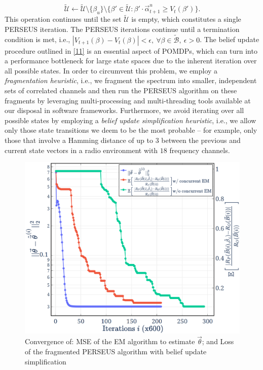 \documentclass[10pt,twocolumn]{IEEEtran}
\begin{document}
$$
\tilde{\mathcal{U}}\leftarrow \tilde{\mathcal{U}}\setminus\{\beta_u\}\setminus
\{\beta'\in\tilde{\mathcal{U}}:\beta'{\cdot}\vec{\alpha}_{t+1}^{u}\geq V_t(\beta')\}.
$$
This operation continues until the set $\tilde{\mathcal{U}}$ is empty, which constitutes a single PERSEUS iteration. The PERSEUS iterations continue until a termination condition is met, i.e., $|V_{t{+}1}(\beta){-}V_{t}(\beta)|{<}\epsilon,\ \forall \beta{\in} \tilde{\mathcal{B}},\ \epsilon{>}0$. The belief update procedure outlined in \eqref{11} is an essential aspect of POMDPs, which can turn into a performance bottleneck for large state spaces due to the inherent iteration over all possible states. In order to circumvent this problem, we employ a \emph{fragmentation heuristic}, i.e., we fragment the spectrum into smaller, independent sets of correlated channels and then run the PERSEUS algorithm on these fragments by leveraging multi-processing and multi-threading tools available at our disposal in software frameworks. Furthermore, we avoid iterating over all possible states by employing a \emph{belief update simplification heuristic}, i.e., we allow only those state transitions we deem to be the most probable -- for example, only those that involve a Hamming distance of up to $3$ between the previous and current state vectors in a radio environment with $18$ frequency channels.
\begin{figure}[t]
    \centering
    \includegraphics[width=0.9\linewidth]{Evaluation_1.png}
    \caption{Convergence of: MSE of the EM algorithm to estimate $\vec{\theta}$; and Loss of the fragmented PERSEUS algorithm with belief update simplification}
    \label{fig:4}
    \vspace{-6mm}
\end{figure}
\vspace{-3mm}
\end{document}
